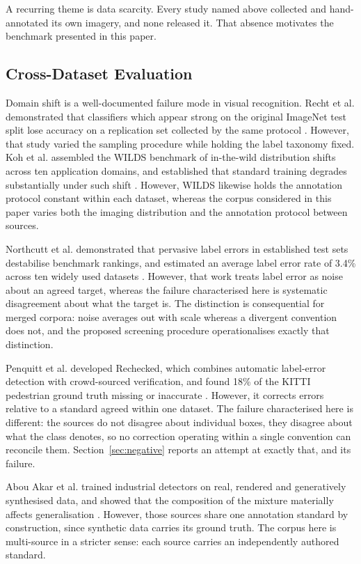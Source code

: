 A recurring theme is data scarcity. Every study named above collected and
hand-annotated its own imagery, and none released it. That absence motivates the
benchmark presented in this paper.

\subsection{Cross-Dataset Evaluation}

\noindent Domain shift is a well-documented failure mode in visual recognition.
Recht et al. demonstrated that classifiers which appear strong
on the original ImageNet test split lose accuracy on a replication set collected
by the same protocol \cite{recht2019}. However, that study varied the sampling procedure while
holding the label taxonomy fixed. Koh et al. assembled the
WILDS benchmark of in-the-wild distribution shifts across ten application
domains, and established that standard training degrades substantially under
such shift \cite{koh2021wilds}. However, WILDS likewise holds the annotation protocol constant within
each dataset, whereas the corpus considered in this paper varies both the imaging
distribution and the annotation protocol between sources.

Northcutt et al. demonstrated that pervasive label errors in
established test sets destabilise benchmark rankings, and estimated an average
label error rate of 3.4\% across ten widely used datasets \cite{northcutt2021}. However, that work
treats label error as noise about an agreed target, whereas the failure
characterised here is systematic disagreement about what the target is. The
distinction is consequential for merged corpora: noise averages out with scale
whereas a divergent convention does not, and the proposed screening procedure
operationalises exactly that distinction.

Penquitt et al. developed Rechecked, which combines automatic label-error detection
with crowd-sourced verification, and found 18\% of the KITTI pedestrian ground truth
missing or inaccurate \cite{penquitt2026}. However, it corrects errors relative to a standard agreed
within one dataset. The failure characterised here is different: the sources do not
disagree about individual boxes, they disagree about what the class denotes, so no
correction operating within a single convention can reconcile them.
Section~\ref{sec:negative} reports an attempt at exactly that, and its failure.

Abou Akar et al. trained industrial detectors on real, rendered and generatively
synthesised data, and showed that the composition of the mixture materially affects
generalisation \cite{abouakar2026}. However, those sources share one annotation standard by
construction, since synthetic data carries its ground truth. The corpus here is
multi-source in a stricter sense: each source carries an independently authored
standard.

